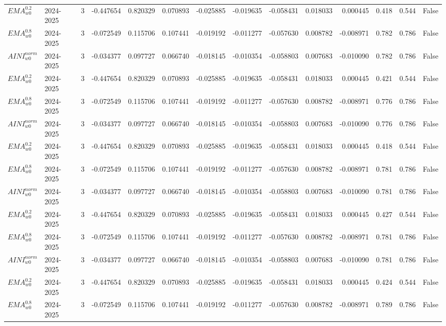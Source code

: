 \begin{tabular}{@{}llrrrrrrrrrlll@{}}
$EMA^{0.2}_{w0}$ & 2024-2025 & 3 & -0.447654 & 0.820329 & 0.070893 & -0.025885 & -0.019635 & -0.058431 & 0.018033 & 0.000445 & 0.418 & 0.544 & False \\
$EMA^{0.8}_{w0}$ & 2024-2025 & 3 & -0.072549 & 0.115706 & 0.107441 & -0.019192 & -0.011277 & -0.057630 & 0.008782 & -0.008971 & 0.782 & 0.786 & False \\
$AINI^{norm}_{w0}$ & 2024-2025 & 3 & -0.034377 & 0.097727 & 0.066740 & -0.018145 & -0.010354 & -0.058803 & 0.007683 & -0.010090 & 0.782 & 0.786 & False \\
$EMA^{0.2}_{w0}$ & 2024-2025 & 3 & -0.447654 & 0.820329 & 0.070893 & -0.025885 & -0.019635 & -0.058431 & 0.018033 & 0.000445 & 0.421 & 0.544 & False \\
$EMA^{0.8}_{w0}$ & 2024-2025 & 3 & -0.072549 & 0.115706 & 0.107441 & -0.019192 & -0.011277 & -0.057630 & 0.008782 & -0.008971 & 0.776 & 0.786 & False \\
$AINI^{norm}_{w0}$ & 2024-2025 & 3 & -0.034377 & 0.097727 & 0.066740 & -0.018145 & -0.010354 & -0.058803 & 0.007683 & -0.010090 & 0.776 & 0.786 & False \\
$EMA^{0.2}_{w0}$ & 2024-2025 & 3 & -0.447654 & 0.820329 & 0.070893 & -0.025885 & -0.019635 & -0.058431 & 0.018033 & 0.000445 & 0.418 & 0.544 & False \\
$EMA^{0.8}_{w0}$ & 2024-2025 & 3 & -0.072549 & 0.115706 & 0.107441 & -0.019192 & -0.011277 & -0.057630 & 0.008782 & -0.008971 & 0.781 & 0.786 & False \\
$AINI^{norm}_{w0}$ & 2024-2025 & 3 & -0.034377 & 0.097727 & 0.066740 & -0.018145 & -0.010354 & -0.058803 & 0.007683 & -0.010090 & 0.781 & 0.786 & False \\
$EMA^{0.2}_{w0}$ & 2024-2025 & 3 & -0.447654 & 0.820329 & 0.070893 & -0.025885 & -0.019635 & -0.058431 & 0.018033 & 0.000445 & 0.427 & 0.544 & False \\
$EMA^{0.8}_{w0}$ & 2024-2025 & 3 & -0.072549 & 0.115706 & 0.107441 & -0.019192 & -0.011277 & -0.057630 & 0.008782 & -0.008971 & 0.781 & 0.786 & False \\
$AINI^{norm}_{w0}$ & 2024-2025 & 3 & -0.034377 & 0.097727 & 0.066740 & -0.018145 & -0.010354 & -0.058803 & 0.007683 & -0.010090 & 0.781 & 0.786 & False \\
$EMA^{0.2}_{w0}$ & 2024-2025 & 3 & -0.447654 & 0.820329 & 0.070893 & -0.025885 & -0.019635 & -0.058431 & 0.018033 & 0.000445 & 0.424 & 0.544 & False \\
$EMA^{0.8}_{w0}$ & 2024-2025 & 3 & -0.072549 & 0.115706 & 0.107441 & -0.019192 & -0.011277 & -0.057630 & 0.008782 & -0.008971 & 0.789 & 0.786 & False \\

\end{tabular}
